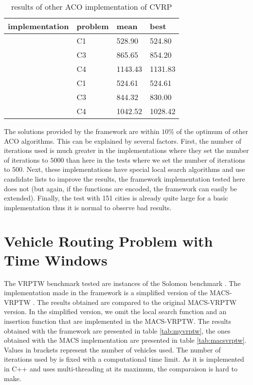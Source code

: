 \begin{table}[h]
\centering
\begin{tabular}{|l|l|l|l|}
\hline
implementation & problem & mean & best \\
\hline
\hline
\cite{bell2004ant} & C1 & 528.90 & 524.80 \\
& C3 & 865.65 & 854.20 \\
& C4 & 1143.43 & 1131.83\\
\hline
\cite{yu2009improved} & C1 & 524.61 & 524.61\\
& C3 & 844.32 & 830.00 \\
& C4 & 1042.52 & 1028.42\\
\hline
\end{tabular}
\caption{results of other ACO implementation of CVRP}
\label{tab:acocvrp}
\end{table}
The solutions provided by the framework are within $10\%$ of the optimum of other ACO algorithms. This can be explained by several factors. First, the number of iterations used is much greater in the implementations \cite{bell2004ant} \cite{yu2009improved} where they set the number of iterations to $5000$ than here in the tests where we set the number of iterations to $500$. Next, these implementations have special local search algorithms and use candidate lists to improve the results, the framework implementation tested here does not (but again, if the functions are encoded, the framework can easily be extended). Finally, the test with 151 cities is already quite large for a basic implementation thus it is normal to observe bad results.


\section{Vehicle Routing Problem with Time Windows}
The VRPTW benchmark tested are instances of the Solomon benchmark \cite{solomon}. The implementation made in the framework is a simplified version of the MACS-VRPTW \cite{gambardella1999macs}. The results obtained are compared to the original MACS-VRPTW version. In the simplified version, we omit the local search function and an insertion function that are implemented in the MACS-VRPTW. The results obtained with the framework are presented in table \ref{tab:myvrptw}, the ones obtained with the MACS implementation are presented in table \ref{tab:macsvrptw}. Values in brackets represent the number of vehicles used. The number of iterations used by \cite{gambardella1999macs}  is fixed with a computational time limit. As it is implemented in C++ and uses multi-threading at its maximum, the comparaison is hard to make.

